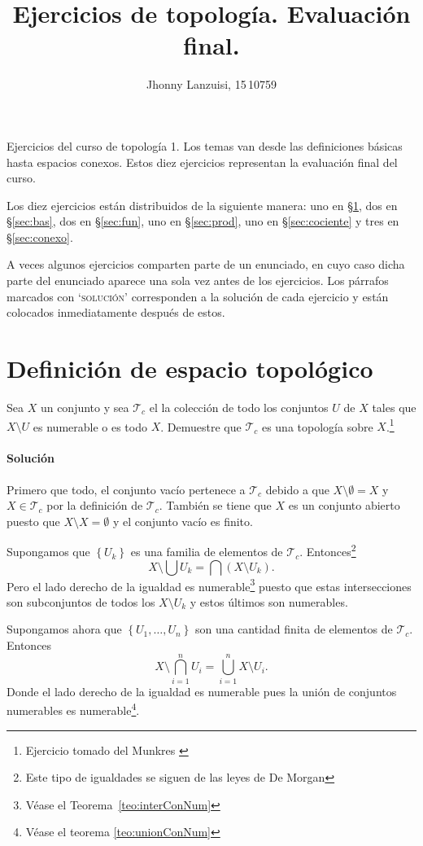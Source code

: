 \documentclass[letterpaper,10pt,final]{article}
\title{Ejercicios de topología. Evaluación final.}
\author{Jhonny Lanzuisi, 15\,10759}
\newcommand{\Tc}{\mathcal{T}_c}
\begin{document}
	\maketitle
	\tableofcontents
\noindent Ejercicios del curso de topología 1. Los temas van desde las definiciones básicas hasta espacios conexos.
Estos diez ejercicios representan la evaluación final del curso.

Los diez ejercicios están distribuidos de la siguiente manera:
uno en \S\ref{sec:def}, dos en \S\ref{sec:bas}, dos en \S\ref{sec:fun}, uno en \S\ref{sec:prod}, uno en \S\ref{sec:cociente} y tres en \S\ref{sec:conexo}.

A veces algunos ejercicios comparten parte de un enunciado, en cuyo caso dicha parte del enunciado aparece una sola vez antes de los ejercicios.
Los párrafos marcados con `\textsc{solución}' corresponden a la solución de cada ejercicio y están colocados inmediatamente después de estos.

\section{Definición de espacio topológico}\label{sec:def}

Sea $X$ un conjunto y sea $\Tc$ el la
colección de todo los conjuntos $U$ de $X$ tales que
$X\setminus U$ es numerable o es todo $X$. Demuestre
que $\Tc$ es una topología sobre $X$.\footnote{Ejercicio tomado del Munkres \cite[\S13, Nº 3]{munkres_topology_2014}}

\paragraph{Solución}

Primero que todo, el conjunto vacío pertenece a $
\Tc $ debido a que $ X\setminus\emptyset=X
$ y $X\in \Tc$ por la definición de
$\Tc$.  También se
tiene que $ X $ es un conjunto abierto puesto que $
X\setminus X=\emptyset $ y el conjunto vacío es finito.

Supongamos que $
\left\{ U_k \right\}$ es una familia de elementos de $
\Tc $.  Entonces\footnote{Este tipo de igualdades se siguen de las leyes de De Morgan}
\[
X\setminus\bigcup U_k= \bigcap (X\setminus U_k).
\]
Pero el lado derecho de la igualdad es numerable\footnote{Véase el Teorema~\ref{teo:interConNum}} puesto
que estas intersecciones son subconjuntos de todos los
$ X\setminus U_k $ y estos últimos son numerables.

Supongamos ahora que $ \left\{ U_1,\dots,U_n \right\} $
son una cantidad finita de elementos de $
\Tc. $ Entonces
\[
X\setminus\bigcap_{i=1}^{n}U_i =
\bigcup_{i=1}^{n} X\setminus U_i.
\]
Donde el lado derecho de la igualdad es numerable pues
la unión de conjuntos numerables es numerable\footnote{Véase el teorema \ref{teo:unionConNum}}.
\end{document}

